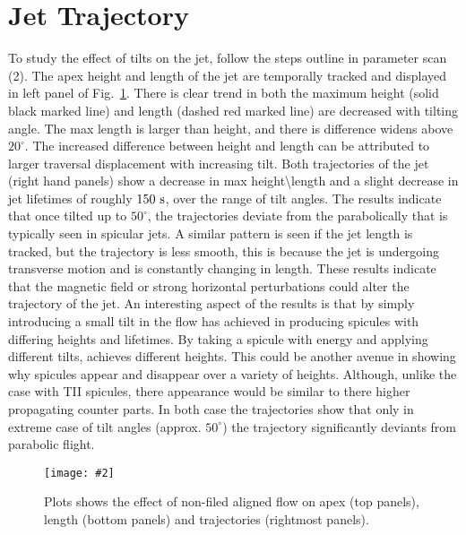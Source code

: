 \documentclass[12pt]{ociamthesis}
\newcommand{\mfig}[4]{
  \begin{figure}
  \begin{center}
  \texttt{[image: \#2]}
  \caption{#3}
  \label{#4}
  \end{center}
  \end{figure}}
\begin{document}
\section{Jet Trajectory}
\label{sec:j_traj_t}
To study the effect of tilts on the jet, follow the steps outline in parameter scan (2). The apex height and length of the jet are temporally tracked and displayed in left panel of Fig.~\ref{tilt_effect_traj}. There is clear trend in both the maximum height (solid black marked line) and length (dashed red marked line) are decreased with tilting angle. The max length is larger than height, and there is difference widens above $20^{\circ}$. The increased difference between height and length can be attributed to larger traversal displacement with increasing tilt. Both trajectories of the jet (right hand panels) show a decrease in max height\textbackslash length and a slight decrease in jet lifetimes of roughly $150~\rm{s}$, over the range of tilt angles. The results indicate that once tilted up to $50^{\circ}$, the trajectories deviate from the parabolically that is typically seen in spicular jets. A similar pattern is seen if the jet length is tracked, but the trajectory is less smooth, this is because the jet is undergoing transverse motion and is constantly changing in length. These results indicate that the magnetic field or strong horizontal perturbations could alter the trajectory of the jet. An interesting aspect of the results is that by simply introducing a small tilt in the flow has achieved in producing spicules with differing heights and lifetimes. By taking a spicule with energy and applying different tilts, achieves different heights. This could be another avenue in showing why spicules appear and disappear over a variety of heights. Although, unlike the case with TII spicules, there appearance would be similar to there higher propagating counter parts. In both case the trajectories show that only in extreme case of tilt angles (approx. $50^{\circ}$) the trajectory significantly deviants from parabolic flight.  
%
\mfig{1}{figures/combine_L_h_comp.png}{Plots shows the effect of non-filed aligned flow on apex (top panels), length (bottom panels) and trajectories (rightmost panels).}{tilt_effect_traj}
\end{document}
